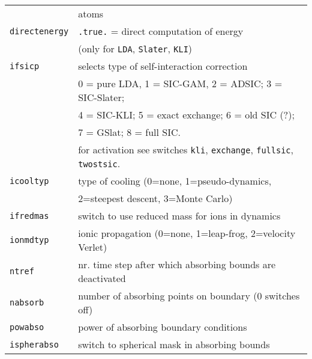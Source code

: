 \documentclass[12pt]{article}
\begin{document}
\begin{tabular}{ll}
{\tt                  }& atoms \\
{\tt directenergy}   & {\tt .true.} = direct computation of energy \\
                       & (only for {\tt LDA}, {\tt Slater}, {\tt KLI})\\
{\tt ifsicp           }& selects type of self-interaction correction\\
    &  0 = pure LDA, 1 = SIC-GAM, 2 = ADSIC; 3 = SIC-Slater; \\
    &  4 = SIC-KLI; 5 = exact exchange; 6 = old SIC (?);\\
    &  7 = GSlat;  8 = full SIC.\\
    & for activation see switches 
     {\tt kli}, {\tt exchange}, {\tt  fullsic}, {\tt twostsic}.\\
{\tt icooltyp         }& type of cooling (0=none, 1=pseudo-dynamics,\\
{\tt                  }& 2=steepest descent, 3=Monte Carlo)\\
{\tt ifredmas         }& switch to use reduced mass for ions in dynamics\\
{\tt ionmdtyp         }& ionic propagation
                         (0=none, 1=leap-frog, 2=velocity Verlet)\\
{\tt ntref}& nr. time step after which absorbing bounds are deactivated
\\
{\tt nabsorb}          & number of absorbing points on boundary (0 switches off) 
\\
{\tt powabso}          & power of absorbing boundary conditions
\\
{\tt ispherabso}       & switch to spherical mask in absorbing bounds
\\
\hline
\end{tabular}
\end{document}

